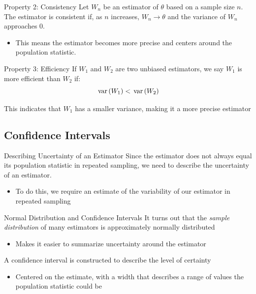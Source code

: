 \documentclass[aspectratio=169,t,11pt,table]{beamer}
\begin{document}
\begin{frame}{Property 2: Consistency}
  Let $W_n$ be an estimator of $\theta$ based on a sample size $n$. The estimator is \alert{consistent} if, as $n$ increases, $W_n \to \theta$ and the variance of $W_n$ approaches 0.  
  
  \pause
  \begin{itemize}
    \item This means the estimator becomes more precise and centers around the population statistic.
  \end{itemize}
\end{frame}

\begin{frame}{Property 3: Efficiency}
  If $W_1$ and $W_2$ are two unbiased estimators, we say $W_1$ is more efficient than $W_2$ if:
  $$
    \var{W_1} < \var{W_2}
  $$
  
  \bigskip
  This indicates that $W_1$ has a smaller variance, making it a more precise estimator
\end{frame}

\subsection*{Confidence Intervals}

\begin{frame}{Describing Uncertainty of an Estimator}
  Since the estimator does not always equal its population statistic in repeated sampling, we need to describe the uncertainty of an estimator.  
  \begin{itemize}
    \item To do this, we require an estimate of the variability of our estimator in repeated sampling
  \end{itemize}
\end{frame}

\begin{frame}{Normal Distribution and Confidence Intervals}
  It turns out that the \emph{sample distribution} of many estimators is approximately normally distributed
  \begin{itemize}
    \item Makes it easier to summarize uncertainty around the estimator
  \end{itemize}

  \bigskip
  \pause
  A \alert{confidence interval} is constructed to describe the level of certainty
  \begin{itemize}
    \item Centered on the estimate, with a width that describes a range of values the population statistic could be
  \end{itemize}
\end{frame}
\end{document}
